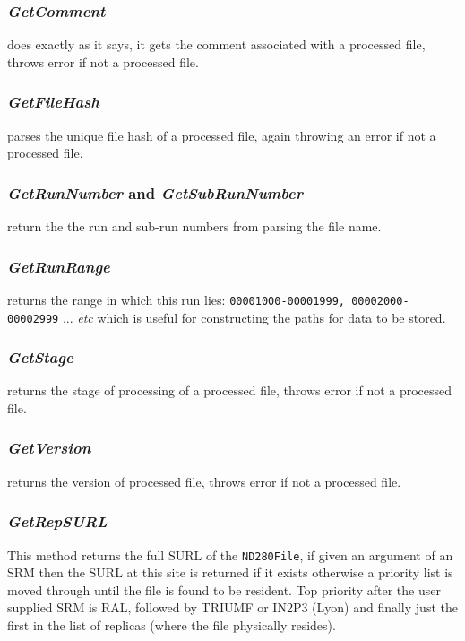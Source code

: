 \documentclass[11pt]{article}
\begin{document}
\subsubsection*{\textit{GetComment}} 
does exactly as it says, it gets the comment associated
with a processed file, throws error if not a processed file.

\subsubsection*{\textit{GetFileHash}} 
parses the unique file hash of a processed file, again
throwing an error if not a processed file.

\subsubsection*{\textit{GetRunNumber} and \textit{GetSubRunNumber}}
return the the run
and sub-run numbers from parsing the file name. 

\subsubsection*{\textit{GetRunRange}} 
returns the range in which this run lies:
\verb+00001000-00001999, 00002000-00002999+ ... \textit{etc} which is
useful for constructing the paths for data to be stored.

\subsubsection*{\textit{GetStage}} 
returns the stage of processing of a processed file, throws
error if not a processed file. 

\subsubsection*{\textit{GetVersion}} 
returns the version of processed file, throws error if not
a processed file. 

\subsubsection*{\textit{GetRepSURL}}
This method returns the full SURL of the \verb+ND280File+, if given an
argument of an SRM then the SURL at this site is returned if it exists
otherwise a priority list is moved through until the file is found to
be resident. Top priority after the user supplied SRM is RAL, followed
by TRIUMF or IN2P3 (Lyon) and finally just the first in the list of
replicas (where the file physically resides). 
\end{document}

